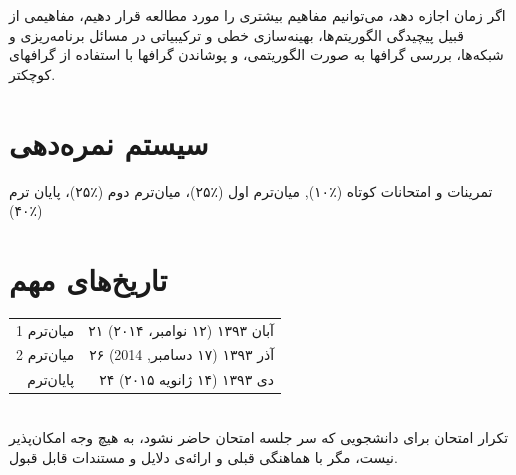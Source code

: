 \documentclass[a4paper]{arman-syllabus}
\begin{document}
{اگر زمان اجازه دهد، می‌توانیم مفاهیم بیشتری را مورد مطالعه قرار دهیم، مفاهیمی از قبیل پیچیدگی الگوریتم‌ها، بهینه‌سازی خطی و ترکیبیاتی در مسائل برنامه‌ریزی و شبکه‌ها، بررسی گرافها به صورت الگوریتمی، و پوشاندن گرافها با استفاده از گرافهای کوچکتر.
\section*{سیستم نمره‌دهی} 
تمرینات و امتحانات کوتاه (٪۱۰), میان‌ترم اول (٪۲۵)، میان‌ترم دوم (٪۲۵)، پایان ترم (٪۴۰)

\section*{تاریخ‌های مهم}
\begin{tabular}{r|r}
  \hline
   میان‌ترم 1 & ۲۱ آبان ۱۳۹۳ (۱۲ نوامبر، ۲۰۱۴) \\
  میان‌ترم 2 & ۲۶ آذر ۱۳۹۳ (۱۷ دسامبر, 2014)  \\
  پایان‌ترم & ۲۴ دی ۱۳۹۳  (۱۴ ژانویه ۲۰۱۵)  \\
  \hline
\end{tabular}  \\[.2cm]
تکرار امتحان برای دانشجویی که سر جلسه امتحان حاضر نشود، به هیچ وجه امکان‌پذیر نیست، مگر با هماهنگی قبلی و ارائه‌ی دلایل و مستندات قابل قبول.
}
\end{document}
